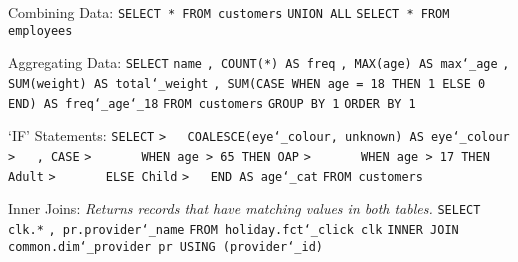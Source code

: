 \vspace{\baselineskip}
Combining Data:\newline
\texttt{SELECT * FROM customers}\newline
\texttt{UNION ALL}\newline
\texttt{SELECT * FROM employees}

\vspace{\baselineskip}
Aggregating Data:\newline
\texttt{SELECT}\newline
\texttt{name}\newline
\texttt{, COUNT(*) AS freq}\newline
\texttt{, MAX(age) AS max\char`_age}\newline
\texttt{, SUM(weight) AS total\char`_weight}\newline
\texttt{, SUM(CASE WHEN age = 18 THEN 1 ELSE 0 END) AS freq\char`_age\char`_18}\newline
\texttt{FROM customers}\newline
\texttt{GROUP BY 1}\newline
\texttt{ORDER BY 1}

\newpage
`IF' Statements:\newline
\texttt{SELECT}\newline
\texttt{>~~~COALESCE(eye\char`_colour, \textquotesingle unknown\textquotesingle) AS eye\char`_colour}\newline
\texttt{>~~~, CASE}\newline
\texttt{>~~~~~~~WHEN age > 65 THEN \textquotesingle OAP\textquotesingle}\newline
\texttt{>~~~~~~~WHEN age > 17 THEN \textquotesingle Adult\textquotesingle}\newline
\texttt{>~~~~~~~ELSE \textquotesingle Child\textquotesingle}\newline
\texttt{>~~~END AS age\char`_cat}\newline
\texttt{FROM customers}

\vspace{\baselineskip}
Inner Joins:\newline
\textit{Returns records that have matching values in both tables.}\newline
\texttt{SELECT}\newline
\texttt{clk.*}\newline
\texttt{, pr.provider\char`_name}\newline
\texttt{FROM holiday.fct\char`_click clk}\newline
\texttt{INNER JOIN common.dim\char`_provider pr USING (provider\char`_id)}

